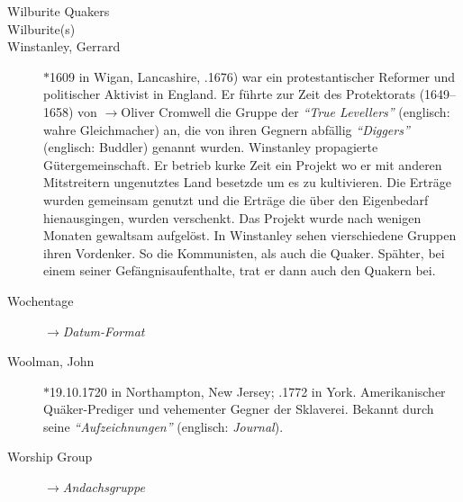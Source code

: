 \begin{description}
 \item[Wilburite Quakers]

 \item[Wilburite(s)]

 \item[Winstanley, Gerrard] $\ast$1609 in Wigan, Lancashire, .1676) war
 ein protestantischer Reformer und politischer Aktivist in England. Er führte
 zur Zeit des Protektorats (1649–1658) von $\to$Oliver Cromwell die Gruppe der
 \textit{"`True Levellers"'} (englisch: wahre Gleichmacher) an, die von ihren
 Gegnern abfällig \textit{"`Diggers"'} (englisch: Buddler) genannt wurden.
 Winstanley propagierte
 Gütergemeinschaft. Er betrieb kurke Zeit ein Projekt wo er mit anderen Mitstreitern
ungenutztes Land besetzde um es zu kultivieren. Die Erträge wurden gemeinsam
genutzt und die Erträge die über den Eigenbedarf hienausgingen, wurden verschenkt.
Das Projekt wurde nach wenigen Monaten gewaltsam aufgelöst. In Winstanley sehen
vierschiedene Gruppen ihren Vordenker. So die Kommunisten, als auch die Quaker.
Spähter, bei einem seiner Gefängnisaufenthalte, trat er dann auch den Quakern
bei. 

\item[Wochentage] $\to$\textit{Datum-Format}

\item[Woolman, John] $\ast$19.10.1720 in Northampton, New Jersey; .1772 in York. Amerikanischer Quäker-Prediger und vehementer Gegner der Sklaverei. Bekannt durch seine \textit{"`Aufzeichnungen"'} (englisch: \textit{Journal}).

\item[Worship Group] $\to$\textit{Andachsgruppe}

 \end{description}


\normalsize